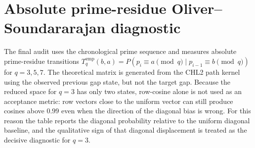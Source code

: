 \documentclass[10pt]{article}
\begin{document}
\section{Absolute prime-residue Oliver--Soundararajan diagnostic}
The final audit uses the chronological prime sequence and measures absolute prime-residue transitions $T_q^{\mathrm{emp}}(b,a)=P(p_i\equiv a\pmod q\mid p_{i-1}\equiv b\pmod q)$ for $q=3,5,7$. The theoretical matrix is generated from the CHL2 path kernel using the observed previous gap state, but not the target gap. Because the reduced space for $q=3$ has only two states, row-cosine alone is not used as an acceptance metric: row vectors close to the uniform vector can still produce cosines above $0.99$ even when the direction of the diagonal bias is wrong. For this reason the table reports the diagonal probability relative to the uniform diagonal baseline, and the qualitative sign of that diagonal displacement is treated as the decisive diagnostic for $q=3$.
\begin{table}[H]\centering\scriptsize
{}
\caption{Absolute prime-residue diagnostic for CHL2 path-exclusion. The diagonal columns report $P(a=b)$ in the reduced residue transition matrix. Pearson $\chi^2/N$ is computed from empirical cell counts and CHL2 row probabilities. The row-cosine is included for comparability across moduli, but it is misleadingly optimistic in the two-state case $q=3$; the wrong-sign diagonal displacement and the largest $\chi^2/N$ value are the diagnostics that invalidate that case.}\label{tab:os}\end{table}
\end{document}

